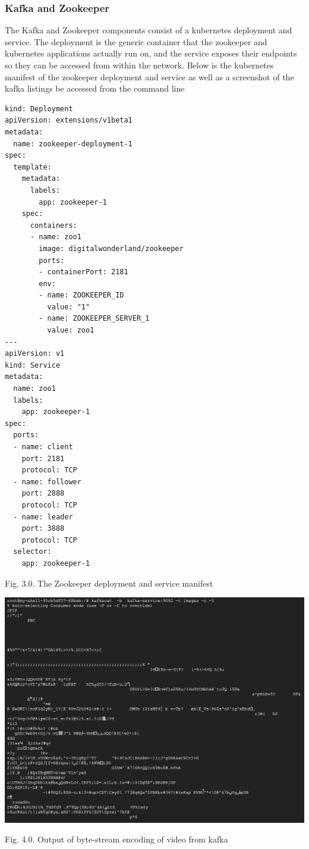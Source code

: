 \documentclass[10pt,journal,compsoc,onecolumn,draftclsnofoot]{IEEEtran}
\begin{document}
\subsubsection{Kafka and Zookeeper}
The Kafka and Zookeeper components consist of a kubernetes deployment and service. The deployment is the generic container that the zookeeper and kubernetes applications actually run on, and the service exposes their endpoints so they can be accessed from within the network. Below is the kubernetes manifest of the zookeeper deployment and service as well as a screenshot of the kafka listings be accessed from the command line
\begin{lstlisting}
kind: Deployment
apiVersion: extensions/v1beta1
metadata:
  name: zookeeper-deployment-1
spec:
  template:
    metadata:
      labels:
        app: zookeeper-1
    spec:
      containers:
      - name: zoo1
        image: digitalwonderland/zookeeper
        ports:
        - containerPort: 2181
        env:
        - name: ZOOKEEPER_ID
          value: "1"
        - name: ZOOKEEPER_SERVER_1
          value: zoo1
---
apiVersion: v1
kind: Service
metadata:
  name: zoo1
  labels:
    app: zookeeper-1
spec:
  ports:
  - name: client
    port: 2181
    protocol: TCP
  - name: follower
    port: 2888
    protocol: TCP
  - name: leader
    port: 3888
    protocol: TCP
  selector:
    app: zookeeper-1
\end{lstlisting}
\hspace*{.5cm}\small{Fig. 3.0. The Zookeeper deployment and service manifest}
\begin{center}
\includegraphics[width=.95\textwidth]{kafka-output.png}\\
\end{center}
\hspace*{.5cm}\small{Fig. 4.0. Output of byte-stream encoding of video from kafka}
\end{document}
